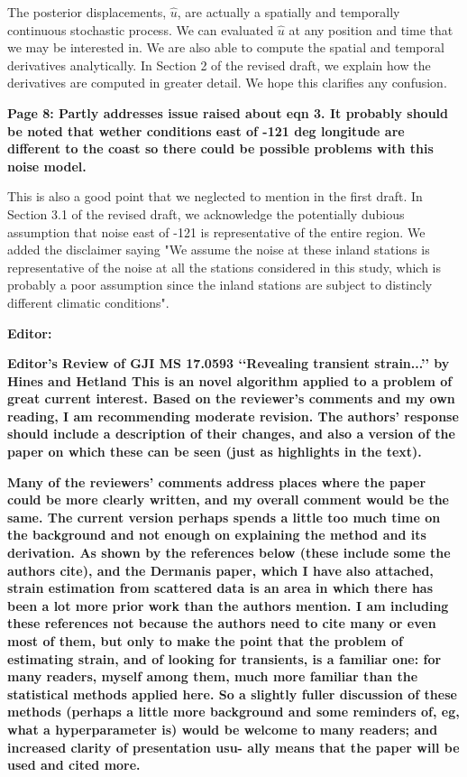 \documentclass[10pt,a4paper]{letter}
\begin{document}
\begin{letter}{}
The posterior displacements, $\hat{u}$, are actually a spatially and
temporally continuous stochastic process. We can evaluated $\hat{u}$
at any position and time that we may be interested in. We are also
able to compute the spatial and temporal derivatives analytically. In
Section 2 of the revised draft, we explain how the derivatives are
computed in greater detail. We hope this clarifies any confusion.

\textbf{Page 8: Partly addresses issue raised about eqn 3.  It
probably should be noted that wether conditions east of -121 deg
longitude are different to the coast so there could be possible
problems with this noise model.}

This is also a good point that we neglected to mention in the first
draft. In Section 3.1 of the revised draft, we acknowledge the
potentially dubious assumption that noise east of -121 is
representative of the entire region. We added the disclaimer saying
"We assume the noise at these inland stations is representative of the
noise at all the stations considered in this study, which is probably
a poor assumption since the inland stations are subject to distincly
different climatic conditions".


\textbf{Editor:}\newline

\textbf{Editor’s Review of GJI MS 17.0593 ‘‘Revealing transient strain...’’ by
Hines and Hetland This is an novel algorithm applied to a problem of
great current interest. Based on the reviewer’s comments and my own
reading, I am recommending moderate revision. The authors’ response
should include a description of their changes, and also a version of
the paper on which these can be seen (just as highlights in the text).}

\textbf{Many of the reviewers’ comments address places where the paper could
be more clearly written, and my overall comment would be the same. The
current version perhaps spends a little too much time on the
background and not enough on explaining the method and its derivation.
As shown by the references below (these include some the authors
cite), and the Dermanis paper, which I have also attached, strain
estimation from scattered data is an area in which there has been a
lot more prior work than the authors mention. I am including these
references not because the authors need to cite many or even most of
them, but only to make the point that the problem of estimating
strain, and of looking for transients, is a familiar one: for many
readers, myself among them, much more familiar than the statistical
methods applied here. So a slightly fuller discussion of these methods
(perhaps a little more background and some reminders of, eg, what a
hyperparameter is) would be welcome to many readers; and increased
clarity of presentation usu- ally means that the paper will be used
and cited more.}


\end{letter}
\end{document}

